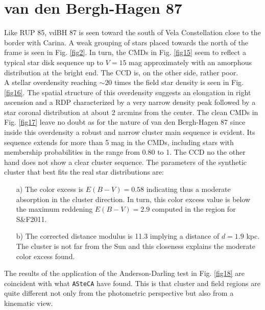 \documentclass[draft]{aa}
\begin{document}
\section{van den Bergh-Hagen 87}

Like RUP 85, vdBH 87 is seen toward the south of Vela Constellation close to
the border with Carina. A weak grouping of stars placed towards the north of
the frame is seen in Fig. \ref{fig2}. In turn, the CMDs in Fig. \ref{fig15}
seem to reflect a typical star disk sequence up to $V = 15$ mag approximately
with an amorphous distribution at the bright end. The CCD is, on the other
side, rather poor.\\

A stellar overdensity reaching $\sim20$ times the field star density is
seen in Fig. \ref{fig16}. The spatial structure of this overdensity suggests an
elongation in right ascension and a RDP characterized by a very narrow density
peak followed by a star coronal distribution at about 2 arcmins from the center.
The clean CMDs in Fig. \ref{fig17} leave no doubt as for the nature of van den
Bergh-Hagen 87 since inside this overdensity a robust and narrow cluster main
sequence is evident. Its sequence extends for more than 5 mag in the
CMDs, including stars with membership probabilities in the range from 0.80 to
1. The CCD no the other hand does not show a clear cluster sequence.
The parameters of the synthetic cluster that best fits the real star
distributions are:

\begin{itemize}
\item [a)] The color excess is $E(B-V) = 0.58$ indicating thus a moderate
    absorption in the cluster direction. In turn, this color excess value is
    below the maximum reddening $E(B-V) = 2.9$ computed in the region for 
    S\&F2011.
\item [b)] The corrected distance modulus is 11.3 implying a distance of $d =
    1.9$ kpc. The cluster is not far from the Sun and this closeness explains
    the moderate color excess found.
\end{itemize}

The results of the application of the Anderson-Darling test in Fig. \ref{fig18}
are coincident with what \texttt{ASteCA} have found. This is that cluster and
field regions are quite different not only from the photometric perspective but
also from a kinematic view.\\
\end{document}
